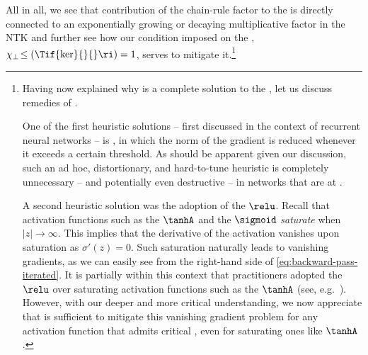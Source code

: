 All in all, we see that contribution of the chain-rule factor to the  is directly connected to an exponentially growing or decaying multiplicative factor in the NTK and further see how our  condition imposed on the , $\chi_{\perp}\!\le(\Tif{\ker}{}{}\ri)=1$, serves to mitigate it.\footnote{
Having now explained why  is a complete solution to the ,
let us discuss remedies of .

One of the first heuristic solutions -- first discussed in the context of recurrent neural networks -- is  \cite{pascanu2013difficulty}, in which the norm of the gradient is reduced whenever it exceeds a certain threshold. As should be apparent given our discussion, such an ad hoc, distortionary, and hard-to-tune heuristic is completely unnecessary -- and potentially even destructive -- in networks that are at . 

A second heuristic solution was the adoption of the $\relu$. Recall that activation functions such as the $\tanhA$ and the $\sigmoid$ \emph{saturate} when $|z| \to \infty$. This implies that the derivative of the activation vanishes upon saturation as $\sigma'(z)=0$. 
Such saturation naturally leads to vanishing gradients, as we can easily see from the right-hand side of \eqref{eq:backward-pass-iterated}. It is partially within this context that practitioners adopted the $\relu$ over saturating activation functions such as the $\tanhA$ (see, e.g.~\cite{glorot2011deep}). However, with our deeper and more critical understanding, we now appreciate that  is sufficient to mitigate this vanishing gradient problem for any activation function that admits critical , even for saturating ones like $\tanhA$. 
}


























